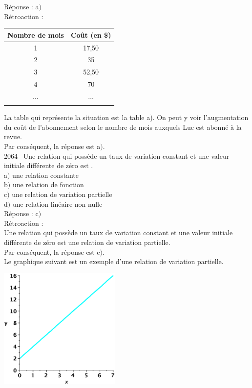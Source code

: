 \documentclass[letterpaper, 12pt]{article}
\begin{document}
R\'eponse : a$)$\\

R\'etroaction :\\
\begin{center}
 \begin{tabular}{|c|c|} \hline
{\bf Nombre de mois } & {\bf Co\^ut (en \$)}  \\ \hline \hline
1 & 17,50 \\ \hline
2 & 35 \\ \hline
3 & 52,50 \\ \hline
4 & 70 \\ \hline
$\ldots$ & $\ldots$ \\ \hline
\multicolumn{2}{c}{}\\
\end{tabular}
\end{center}
La table qui repr\'esente la situation est la table a). On peut y voir l'augmentation du co\^ut de l'abonnement selon le nombre de mois auxquels Luc est abonn\'e \`a la revue.\\
Par cons\'equent, la r\'eponse est a$)$.\\

2064-- Une relation qui poss\`ede un taux de variation constant et une valeur initiale diff\'erente de z\'ero est \underline{\qquad\qquad}. \\

a$)$ une relation constante\\
b$)$ une relation de fonction\\
c$)$ une relation de variation partielle \\
d$)$ une relation lin\'eaire non nulle\\

R\'eponse : c$)$\\

R\'etroaction :\\
Une relation qui poss\`ede un taux de variation constant et une valeur initiale diff\'erente de z\'ero est une relation de variation partielle. \\
Par cons\'equent, la r\'eponse est c$)$.\\
Le graphique suivant est un exemple d'une relation de variation partielle.\\
\begin{center}
 \includegraphics[width=6cm,bb=20 118 575 673]{Q2060.eps}
\end{center}
\end{document}
